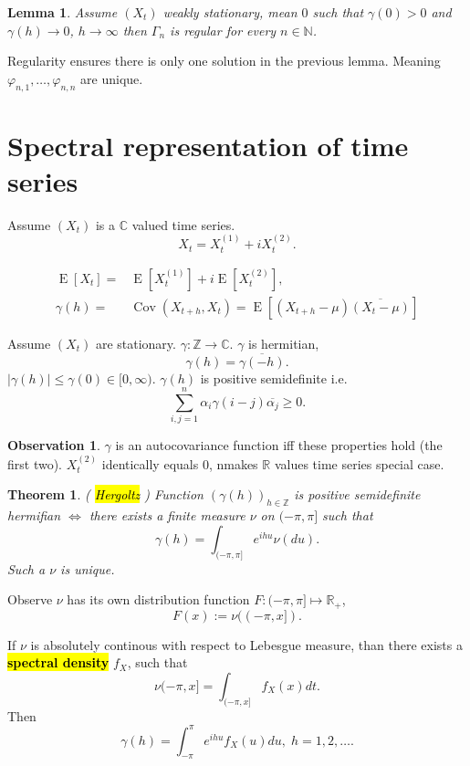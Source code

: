 \documentclass[12pt,a4paper, notitlepage]{book}
\newcommand{\hlc}[2][yellow]{ {\sethlcolor{#1} \hl{#2}} }
\newcommand{\hlcr}[1]{\hlc[lightred]{#1}}
\theoremstyle{definition} %
\newtheorem*{observation}{Observation}
\theoremstyle{plain} %
\newtheorem{lemma}{Lemma}[chapter]
\newtheorem{theorem}{Theorem}
\newcommand{\R}{\mathbb R}
\newcommand{\N}{\mathbb N}
\newcommand{\Z}{\mathbb Z}
\newcommand{\C}{\mathbb C}
\DeclareMathOperator{\Cov}{Cov}
\DeclareMathOperator{\E}{E}
\newcommand{\New}[1]{ {\bf \hlcr{#1} } }
\newcommand{\Important}[1]{ {\it \hlc{#1} } }
\begin{document}
\begin{lemma}
Assume $(X_t)$ weakly stationary, mean $0$ such that $\gamma(0) > 0$ and $\gamma(h) \rightarrow 0$, $h \rightarrow \infty$ then $\Gamma_n$ is regular for every $n \in \N$. 
\end{lemma}

Regularity ensures there is only one solution in the previous lemma. Meaning $\varphi_{n,1}, \dots, \varphi_{n,n}$ are unique. 


\section{ Spectral representation of time series}

Assume $(X_t)$ is a $\C$ valued time series.
\[ X_t = X_t^{(1)} + i X_t^{(2)} . \]

\begin{align*} \E[X_t] = & \E[X_t^{(1)}] + i \E[X_t^{(2)} ] , \\ 
\gamma(h) = & \Cov(X_{t+h}, X_t) = \E[ (X_{t+h} - \mu)\overline{(X_t - \mu)} ] \end{align*}

Assume $(X_t)$ are stationary. $\gamma: \Z \rightarrow \C$. $\gamma$ is hermitian, 
\[ \gamma(h) = \overline{\gamma(-h)}. \]  $|\gamma(h)| \leq \gamma(0) \in [0, \infty)$. $\gamma(h)$ is positive semidefinite i.e.
\[ \sum_{i,j = 1}^n \alpha_i \gamma(i-j)\overline{\alpha_j} \geq 0. \]

\begin{observation}
$\gamma$ is an autocovariance function iff these properties hold (the first two).
$X_t^{(2)}$ identically equals $0$, nmakes $\R$ values time series special case. 
\end{observation}

\begin{theorem} (\Important{Hergoltz})
Function $(\gamma(h))_{h \in\Z}$ is positive semidefinite hermifian $\iff $ there exists a finite measure $\nu$ on $(-\pi, \pi]$ such that 
\[ \gamma(h) = \int_{(-\pi,\pi]} e^{i h u}\nu(du). \] 
Such a $\nu$ is unique.
\end{theorem}

Observe $\nu$ has its own distribution function $F : (-\pi, \pi] \mapsto \R_+$, 
\[ F(x) := \nu((-\pi,x]) . \]


If $\nu$ is absolutely continous with respect to Lebesgue measure, than there exists a \New{ spectral density} $f_X$, such that \[ \nu(-\pi, x] = \int_{(-\pi,x]}f_X(x) dt. \]
 Then 
\[ \gamma(h) = \int_{-\pi}^\pi e^{i h u}f_X(u) du , \; h = 1,2, \dots. \]
\end{document}
